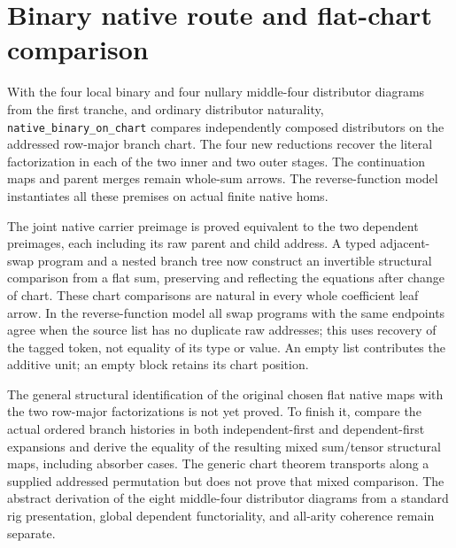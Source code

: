 \documentclass{article}
\begin{document}
\section*{Binary native route and flat-chart comparison}
With the four local binary and four nullary middle-four distributor
diagrams from the first tranche, and ordinary distributor naturality,
\texttt{native\_binary\_on\_chart} compares independently composed
distributors on the addressed row-major branch chart. The four new
reductions recover the literal factorization in each of the two inner
and two outer stages. The continuation maps and parent merges remain
whole-sum arrows. The reverse-function model instantiates all these
premises on actual finite native homs.

The joint native carrier preimage is proved equivalent to the two
dependent preimages, each including its raw parent and child address.
A typed adjacent-swap program and a nested branch tree now construct an
invertible structural comparison from a flat sum, preserving and
reflecting the equations after change of chart. These chart comparisons
are natural in every whole coefficient leaf arrow. In the reverse-function
model all swap programs with the same endpoints agree when the source
list has no duplicate raw addresses; this uses recovery of the tagged
token, not equality of its type or value. An empty list contributes the
additive unit; an empty block retains its chart position.

The general structural identification of the original chosen flat native
maps with the two row-major factorizations is not yet proved. To finish
it, compare the actual ordered branch histories in both independent-first
and dependent-first expansions and derive the equality of the resulting
mixed sum/tensor structural maps, including absorber cases. The generic
chart theorem transports along a supplied addressed permutation but does
not prove that mixed comparison. The abstract derivation of the eight
middle-four distributor diagrams from a standard rig presentation,
global dependent functoriality, and all-arity coherence remain separate.
\end{document}

